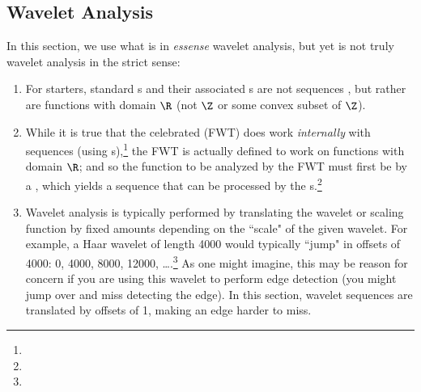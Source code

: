\subsection{Wavelet Analysis}
In this section, we use what is in \emph{essense} wavelet analysis,
but yet is not truly wavelet analysis in the strict sense:
\begin{enumerate}
  \item For starters, standard s and their associated s are not sequences ,
        but rather are functions with domain $\R$ (not $\Z$ or some convex subset of $\Z$).
  \item While it is true that the celebrated  (FWT) does work \emph{internally} with sequences
        (using s),\footnote{} 
        the FWT is actually defined to work on functions with domain $\R$;
        and so the function to be analyzed by the FWT must first be  by 
        a , which yields a sequence that can be processed by the 
        s.\footnote{}
  \item Wavelet analysis is typically performed by translating the wavelet or scaling function 
        by fixed amounts depending on the ``scale" of the given wavelet.
        For example, a Haar wavelet of length 4000 would typically ``jump" in offsets of 4000:
        0, 4000, 8000, 12000, \ldots.\footnote{}
        As one might imagine, this may be reason for concern if you are using this wavelet to 
        perform edge detection (you might jump over and miss detecting the edge).
        In this section, wavelet sequences are translated by offsets of 1, making an edge harder to miss.
\end{enumerate}
